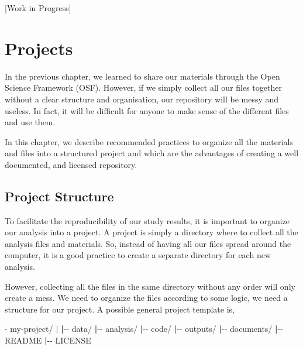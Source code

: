 \documentclass[
  11pt,
]{book}
\newenvironment{Shaded}{\begin{snugshade}}{\end{snugshade}}
\newcommand{\ExtensionTok}[1]{#1}
\newcommand{\KeywordTok}[1]{\textcolor[rgb]{0.13,0.29,0.53}{\textbf{#1}}}
\newcommand{\NormalTok}[1]{#1}
\begin{document}
{[}Work in Progress{]}

\hypertarget{project-chapter}{%
\chapter{Projects}\label{project-chapter}}

In the previous chapter, we learned to share our materials through the Open Science Framework (OSF). However, if we simply collect all our files together without a clear structure and organisation, our repository will be messy and useless. In fact, it will be difficult for anyone to make sense of the different files and use them.

In this chapter, we describe recommended practices to organize all the materials and files into a structured project and which are the advantages of creating a well documented, and licensed repository.

\hypertarget{project-structure}{%
\section{Project Structure}\label{project-structure}}

To facilitate the reproducibility of our study results, it is important to organize our analysis into a project. A project is simply a directory where to collect all the analysis files and materials. So, instead of having all our files spread around the computer, it is a good practice to create a separate directory for each new analysis.

However, collecting all the files in the same directory without any order will only create a mess. We need to organize the files according to some logic, we need a structure for our project. A possible general project template is,

\begin{Shaded}
\begin{Highlighting}[]
\ExtensionTok{{-}}\NormalTok{ my{-}project/}
    \KeywordTok{|}
    \KeywordTok{|}\ExtensionTok{{-}{-}}\NormalTok{ data/}
    \KeywordTok{|}\ExtensionTok{{-}{-}}\NormalTok{ analysis/}
    \KeywordTok{|}\ExtensionTok{{-}{-}}\NormalTok{ code/}
    \KeywordTok{|}\ExtensionTok{{-}{-}}\NormalTok{ outputs/}
    \KeywordTok{|}\ExtensionTok{{-}{-}}\NormalTok{ documents/}
    \KeywordTok{|}\ExtensionTok{{-}{-}}\NormalTok{ README}
    \KeywordTok{|}\ExtensionTok{{-}{-}}\NormalTok{ LICENSE}
\end{Highlighting}
\end{Shaded}
\end{document}
